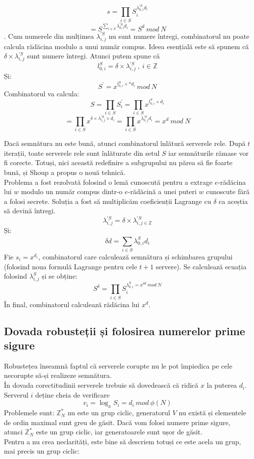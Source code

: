 \documentclass[12]{report}
\begin{document}
$$s=\prod_{i \in S}^{} S_{i}^{\lambda_{0,i}^{'S} d_i}$$
$$ = S^{\sum_{i \in S}^{}\lambda_{0,i}^{'S} d_i} = S^d \ mod \ N$$.
Cum numerele din mulțimea $ \lambda_{i,j}^{'S}$ nu sunt numere întregi, combinatorul nu poate calcula rădăcina modulo a unui număr compus. Ideea esențială este să spunem că $\delta \times \lambda_{i,j}^{'S}$ sunt numere întregi. Atunci putem spune că 
$$l_{0,i}^{S} = \delta \times \lambda_{i,j}^{'S} \ , \ i \in \mathbb{Z} $$
Și:
$$ S^{'} = x^{l_{0,i}^{S} \times * d_i } \ mod \ N   $$
Combinatorul va calcula:
$$S = \prod_{i \in S}^{} S_{i}^{'} = \prod_{i \in S}^{} x^{l_{0,i}^{S} \times d_i    } $$
$$ = \prod_{i \in S}^{}  x^{\delta \times \lambda_{i,j}^{'S} \times d_i} = \prod_{i \in S}^{} 
x^{\lambda_{0,j}^{'S} d_i} = x^d \ mod \ N  $$

Dacă semnătura nu este bună, atunci combinatorul înlătură serverele rele. După $t$ iterații, toate serverele rele sunt înlăturate din setul $S$ iar semnăturile rămase vor fi corecte. Totuși, nici această redefinire a subgrupului nu părea să fie foarte bună, și Shoup a propus o nouă tehnică. \\
Problema a fost rezolvată folosind o lemă cunoscută pentru a extrage $e$-rădăcina lui $w$ modulo un număr compus dintr-o $e$-rădăcină a unei puteri $w$ cunoscute fără a folosi secrete. Soluția a fost să multiplicăm coeficienții Lagrange cu $\delta$ ca aceștia să devină întregi. 
$$ \lambda_{i,j}^{'S} = \delta \times \lambda_{i,j \in \mathbb{Z}}^{'S} $$
Și:
$$ \delta d = \sum_{i \in S}^{} \lambda_{0,i}^{S} d_i $$
Fie $ s_i = x^{d_i} $, combinatorul care calculează semnătura și schimbarea grupului (folosind noua formulă Lagrange pentru cele $t+1$ servere). Se calculează ecuația folosind $\lambda_{i,j}^{S} $ și se obține:
$$S^{\delta} = \prod_{i \in S}^{} S_{i}^{\lambda_{0,i}^{S} = x^{\delta d} \ mod \ N}$$
În final, combinatorul calculează rădăcina lui $x^d$.

\subsection{Dovada robusteții și folosirea numerelor prime sigure}
Robustețea înseamnă faptul că serverele corupte nu le pot împiedica pe cele necorupte să-și realizeze semnătura. \\
În dovada corectitudinii serverele trebuie să dovedească că ridică $x$ la puterea $d_i$. Serverul $i$ deține cheia de verificare
$$ v_i = \log_{x} S_i = d_i \ mod \ \phi(N)$$
Problemele sunt: $\mathbb{Z}_{N}^{*}$ nu este un grup ciclic,  generatorul $V$ nu există și elementele de ordin maximal sunt greu de găsit. Dacă vom folosi numere prime sigure, atunci $\mathbb{Z}_{N}^{*}$ este un grup ciclic, iar generatoarele sunt ușor de găsit. \\
Pentru a nu crea neclarități, este bine să descriem totuși ce este acela un grup, mai precis un grup ciclic: 
\end{document}
